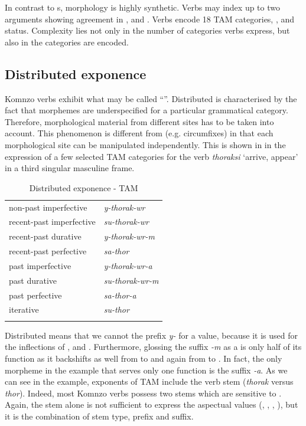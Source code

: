 In contrast to s,  morphology is highly synthetic. Verbs may index up to two arguments showing agreement in ,  and . Verbs encode 18 TAM categories, ,  and  status. Complexity lies not only in the number of categories verbs express, but also in the categories are encoded.

\subsection{Distributed exponence}

Komnzo verbs exhibit what may be called ``''. Distributed  is characterised by the fact that morphemes are underspecified for a particular grammatical category. Therefore, morphological material from different sites has to be taken into account. This phenomenon is different from  (e.g. circumfixes) in that each morphological site can be manipulated independently. This is shown in  in the expression of a few selected TAM categories for the verb \emph{thoraksi} `arrive, appear' in a third singular masculine frame.

\begin{table}
\caption{Distributed exponence - TAM}
\label{tab-01-thoraksi}
	\begin{tabularx}{.66\textwidth}{Xl}
	\lsptoprule
		non-past imperfective & \emph{y-thorak-wr}\\
		recent-past imperfective & \emph{su-thorak-wr}\\
		recent-past durative & \emph{y-thorak-wr-m}\\
		recent-past perfective & \emph{sa-thor}\\
		past imperfective & \emph{y-thorak-wr-a}\\
		past durative & \emph{su-thorak-wr-m}\\
		past perfective & \emph{sa-thor-a}\\
		iterative & \emph{su-thor}\\
		\lspbottomrule
	\end{tabularx}
\end{table}%

Distributed  means that we cannot  the prefix \emph{y-} for a  value, because it is used for the inflections of ,  and . Furthermore, glossing the suffix \emph{-m} as a  is only half of its function as it backshifts  as well from  to  and again from  to  . In fact, the only morpheme in the example that serves only one function is the  suffix \emph{-a}. As we can see in the example, exponents of TAM include the verb stem (\emph{thorak} versus \emph{thor}). Indeed, most Komnzo verbs possess two stems which are sensitive to . Again, the stem alone is not sufficient to express the aspectual values (, , , ), but it is the combination of stem type, prefix and suffix.

